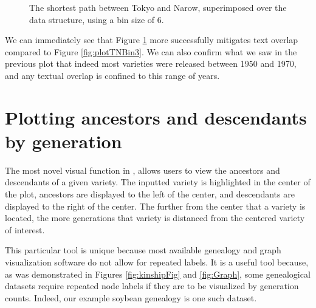 \documentclass[article,shortnames]{jss}
\begin{document}
\clearpage

\begin{figure}[H]
    \centering
    \caption{The shortest path between Tokyo and Narow, superimposed over the data structure, using a bin size of 6.}
    \label{fig:plotTNBin6}
\end{figure}

We can immediately see that Figure \ref{fig:plotTNBin6} more successfully mitigates text overlap compared to Figure \ref{fig:plotTNBin3}. We can also confirm what we saw in the previous plot that indeed most varieties were released between 1950 and 1970, and any textual overlap is confined to this range of years.

\section{Plotting ancestors and descendants by generation}
\label{remedy}

The most novel visual function in ,  allows users to view the ancestors and descendants of a given variety. The inputted variety is highlighted in the center of the plot, ancestors are displayed to the left of the center, and descendants are displayed to the right of the center. The further from the center that a variety is located, the more generations that variety is distanced from the centered variety of interest.

This particular  tool is unique because most available genealogy and graph visualization software do not allow for repeated labels. It is a useful tool because, as was demonstrated in Figures \ref{fig:kinshipFig} and \ref{fig:Graph}, some genealogical datasets require repeated node labels if they are to be visualized by generation counts. Indeed, our example soybean genealogy is one such dataset.
\end{document}
